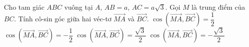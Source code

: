 \begin{ex}%
	Cho tam giác $ABC$ vuông tại $A$, $AB=a$, $AC=a\sqrt{3} $. Gọi $M$ là trung điểm của $BC$. Tính cô-sin góc giữa hai véc-tơ $\overrightarrow {MA}$ và $\overrightarrow {BC}$.
	\choice
	{$\cos \left(\overrightarrow {MA},\overrightarrow {BC}\right)=\dfrac {1}{2}$}
	{\True $\cos \left(\overrightarrow {MA},\overrightarrow {BC}\right)=-\dfrac {1}{2}$}
	{$\cos \left(\overrightarrow {MA},\overrightarrow {BC}\right)=\dfrac {\sqrt{3}}{2}$}
	{$\cos \left(\overrightarrow {MA},\overrightarrow {BC}\right)=-\dfrac {\sqrt{3}}{2}$}
\end{ex}

